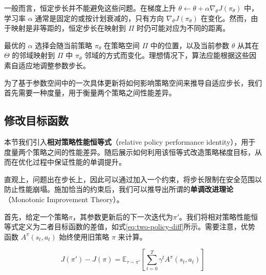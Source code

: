 \documentclass[lang=cn,newtx,10pt,scheme=chinese]{elegantbook}
\begin{document}
一般而言，恒定步长并不能避免这些问题。在梯度上升 $\theta\leftarrow\theta+\alpha \nabla_{\theta} J(\pi_{\theta})$ 中，学习率 $\alpha$ 通常是固定的或按计划衰减的，只有方向 $\nabla_{\theta}J(\pi_{\theta})$ 在变化。然而，由于映射是非等距的，恒定步长在映射到 $\Pi$ 时仍可能对应为不同的距离。

最优的 $\alpha$ 选择会随当前策略 $\pi_{\theta}$ 在策略空间 $\Pi$ 中的位置，以及当前参数 $\theta$ 从其在 $\Theta$ 的邻域映射到 $\Pi$ 中 $\pi_{\theta}$ 邻域的方式而变化。理想情况下，算法应能根据这些因素自适应地调整参数步长。

为了基于参数空间中的一次具体更新将如何影响策略空间来推导自适应步长，我们首先需要一种度量，用于衡量两个策略之间性能差异。

\subsection{修改目标函数}

本节我们引入\textbf{相对策略性能恒等式}（relative policy performance identity），用于度量两个策略之间的性能差异。随后展示如何利用该恒等式改造策略梯度目标，从而在优化过程中保证性能的单调提升。

直观上，问题出在步长上，因此可以通过加入一个约束，将步长限制在安全范围以防止性能崩塌。施加恰当的约束后，我们可以推导出所谓的\textbf{单调改进理论}（Monotonic Improvement Theory）。

首先，给定一个策略$\pi$，其参数更新后的下一次迭代为$\pi'$。我们将相对策略性能恒等式定义为二者目标函数的差值，如式\ref{eq:two-policy-diff}所示。需要注意，优势函数 $A^{\pi}(s_t,a_t)$ 始终使用旧策略 $\pi$ 来计算。

\begin{equation}
J(\pi')-J(\pi)=\mathbb{E}_{\tau\sim\pi'}\left[ \sum^T_{t=0}\gamma^tA^\pi(s_t,a_t) \right]\label{eq:two-policy-diff}
\end{equation}
\end{document}
